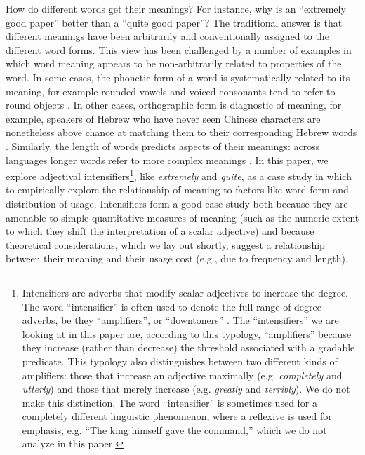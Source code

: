 \documentclass[10pt,letterpaper]{article}
\newcommand{\w}[1]{\emph{#1}}
\begin{document}
How do different words get their meanings?
For instance, why is an ``extremely good paper'' better than a ``quite good paper''? The traditional answer \cite{saussure} is that different meanings have been arbitrarily and conventionally assigned to the different word forms.
This view has been challenged by a number of examples in which word meaning appears to be non-arbitrarily related to properties of the word.
In some cases, the phonetic form of a word is systematically related to its meaning, for example rounded vowels and voiced consonants tend to refer to round objects \cite{maluma-takete, bouba-kiki, bouba-kiki2, takete-uloomo}. 
In other cases, orthographic form is diagnostic of meaning, for example, speakers of Hebrew who have never seen Chinese characters are nonetheless above chance at matching them to their corresponding Hebrew words \cite{koriat}. 
Similarly, the length of words predicts aspects of their meanings: across languages longer words refer to more complex meanings \cite{lewis}.
In this paper, we explore adjectival intensifiers\footnote{Intensifiers are adverbs that modify scalar adjectives to increase the degree. The word ``intensifier'' is often used to denote the full range of degree adverbs, be they ``amplifiers'', or ``downtoners'' \cite{quirk}. The ``intensifiers'' we are looking at in this paper are, according to this typology, ``amplifiers'' because they increase (rather than decrease) the threshold associated with a gradable predicate. This typology also distinguishes between two different kinds of amplifiers: those that increase an adjective maximally (e.g. \w{completely} and \w{utterly}) and those that merely increase (e.g. \w{greatly} and \w{terribly}). We do not make this distinction. The word ``intensifier'' is sometimes used for a completely different linguistic phenomenon, where a reflexive is used for emphasis, e.g. ``The king himself gave the command,'' which we do not analyze in this paper.}, like \w{extremely} and \w{quite},
as a case study in which to empirically explore the relationship of meaning to factors like word form and distribution of usage.
Intensifiers form a good case study both because they are amenable to simple quantitative measures of meaning (such as the numeric extent to which they shift the interpretation of a scalar adjective) and because theoretical considerations, which we lay out shortly, suggest a relationship between their meaning and their usage cost (e.g., due to frequency and length).
\end{document}
